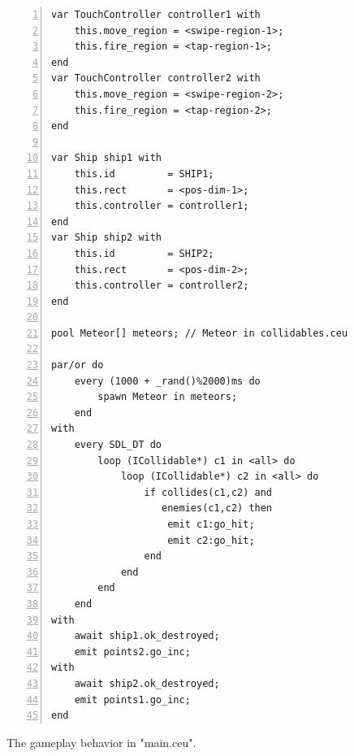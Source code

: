 \documentclass[preprint]{sigplanconf}
\newcommand{\1}{\;}
\newcommand{\2}{\;\;}
\newcommand{\3}{\;\;\;}
\newcommand{\5}{\;\;\;\;\;}
\begin{document}
\begin{figure}%
\begin{lstlisting}[numbers=left,xleftmargin=3em]
var TouchController controller1 with
    this.move_region = <swipe-region-1>;
    this.fire_region = <tap-region-1>;
end
var TouchController controller2 with
    this.move_region = <swipe-region-2>;
    this.fire_region = <tap-region-2>;
end

var Ship ship1 with
    this.id         = SHIP1;
    this.rect       = <pos-dim-1>;
    this.controller = controller1;
end
var Ship ship2 with
    this.id         = SHIP2;
    this.rect       = <pos-dim-2>;
    this.controller = controller2;
end

pool Meteor[] meteors; // Meteor in collidables.ceu

par/or do
    every (1000 + _rand()%2000)ms do
        spawn Meteor in meteors;
    end
with
    every SDL_DT do
        loop (ICollidable*) c1 in <all> do
            loop (ICollidable*) c2 in <all> do
                if collides(c1,c2) and
                   enemies(c1,c2) then
                    emit c1:go_hit;
                    emit c2:go_hit;
                end
            end
        end
    end
with
    await ship1.ok_destroyed;
    emit points2.go_inc;
with
    await ship2.ok_destroyed;
    emit points1.go_inc;
end
\end{lstlisting}
\caption{ The gameplay behavior in "main.ceu".
\label{lst.apps.rocks.3}
}
\end{figure}
\end{document}

